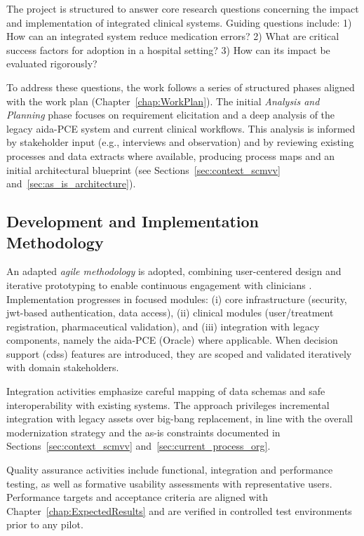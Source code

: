 The project is structured to answer core research questions concerning the impact and implementation of integrated clinical systems. Guiding questions include: 1) How can an integrated system reduce medication errors? 2) What are critical success factors for adoption in a hospital setting? 3) How can its impact be evaluated rigorously?

To address these questions, the work follows a series of structured phases aligned with the work plan (Chapter~\ref{chap:WorkPlan}). The initial \textit{Analysis and Planning} phase focuses on requirement elicitation and a deep analysis of the legacy \gls{aida}-PCE system and current clinical workflows. This analysis is informed by stakeholder input (e.g., interviews and observation) and by reviewing existing processes and data extracts where available, producing process maps and an initial architectural blueprint (see Sections~\ref{sec:context_scmvv} and~\ref{sec:as_is_architecture}).

\subsection{Development and Implementation Methodology}

An adapted \textit{agile methodology} is adopted, combining user-centered design and iterative prototyping to enable continuous engagement with clinicians \cite{fowler2018}. Implementation progresses in focused modules: (i) core infrastructure (security, \gls{jwt}-based authentication, data access), (ii) clinical modules (user/treatment registration, pharmaceutical validation), and (iii) integration with legacy components, namely the \gls{aida}-PCE (Oracle) where applicable. When decision support (\gls{cdss}) features are introduced, they are scoped and validated iteratively with domain stakeholders.

Integration activities emphasize careful mapping of data schemas and safe interoperability with existing systems. The approach privileges incremental integration with legacy assets over big-bang replacement, in line with the overall modernization strategy and the as-is constraints documented in Sections~\ref{sec:context_scmvv} and~\ref{sec:current_process_org}.

Quality assurance activities include functional, integration and performance testing, as well as formative usability assessments with representative users. Performance targets and acceptance criteria are aligned with Chapter~\ref{chap:ExpectedResults} and are verified in controlled test environments prior to any pilot.

